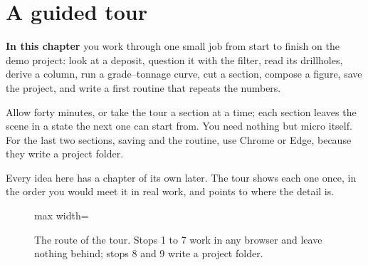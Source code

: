 \chapter{A guided tour}\label{ch:tour}
\begin{goals}
\textbf{In this chapter} you work through one small job from start to finish on the demo project: look at a deposit, question it with the filter, read its drillholes, derive a column, run a grade–tonnage curve, cut a section, compose a figure, save the project, and write a first routine that repeats the numbers.
\end{goals}

Allow forty minutes, or take the tour a section at a time; each section leaves the scene in a state the next one can start from. You need nothing but micro itself. For the last two sections, saving and the routine, use Chrome or Edge, because they write a project folder.

Every idea here has a chapter of its own later. The tour shows each one once, in the order you would meet it in real work, and points to where the detail is.

\begin{figure}[htbp]\centering
\begin{adjustbox}{max width=\linewidth}\end{adjustbox}
\caption{The route of the tour. Stops 1 to 7 work in any browser and leave nothing behind; stops 8 and 9 write a project folder.}\label{fig:tour-route}
\end{figure}

